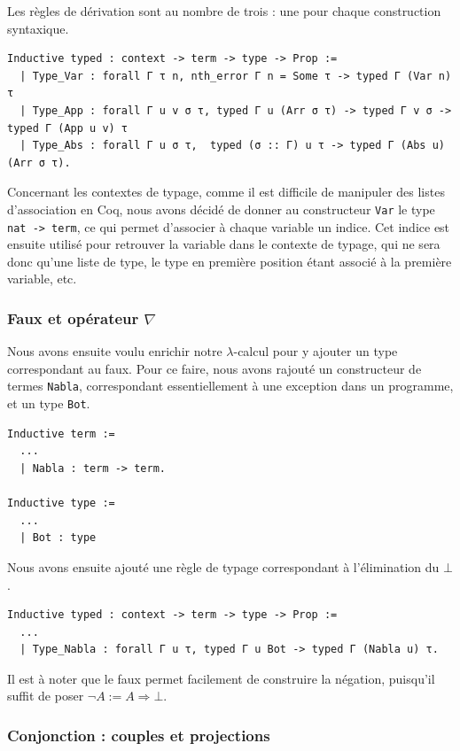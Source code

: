 \documentclass[a4paper]{article}
\theoremstyle{remark}
\theoremstyle{remark}
\theoremstyle{remark}
\theoremstyle{definition}
\theoremstyle{definition}
\theoremstyle{definition}
\begin{document}
Les règles de dérivation sont au nombre de trois : une pour chaque construction syntaxique.
\begin{verbatim}
Inductive typed : context -> term -> type -> Prop :=
  | Type_Var : forall Γ τ n, nth_error Γ n = Some τ -> typed Γ (Var n) τ
  | Type_App : forall Γ u v σ τ, typed Γ u (Arr σ τ) -> typed Γ v σ -> typed Γ (App u v) τ
  | Type_Abs : forall Γ u σ τ,  typed (σ :: Γ) u τ -> typed Γ (Abs u) (Arr σ τ).
\end{verbatim}

Concernant les contextes de typage, comme il est difficile de manipuler des listes d'association en Coq, nous avons décidé de donner au constructeur \verb+Var+ le type \verb+nat -> term+, ce qui permet d'associer à chaque variable un indice. Cet indice est ensuite utilisé pour retrouver la variable dans le contexte de typage, qui ne sera donc qu'une liste de type, le type en première position étant associé à la première variable, etc.

\subsubsection{Faux et opérateur $\nabla$}

Nous avons ensuite voulu enrichir notre $\lambda$-calcul pour y ajouter un type correspondant au faux. Pour ce faire, nous avons rajouté un constructeur de termes \verb+Nabla+, correspondant essentiellement à une exception dans un programme, et un type \verb+Bot+.
\begin{verbatim}
Inductive term :=
  ...
  | Nabla : term -> term.
  
Inductive type :=
  ...
  | Bot : type
\end{verbatim}

Nous avons ensuite ajouté une règle de typage correspondant à l'élimination du $\bot$.
\begin{verbatim}
Inductive typed : context -> term -> type -> Prop :=
  ...
  | Type_Nabla : forall Γ u τ, typed Γ u Bot -> typed Γ (Nabla u) τ.
\end{verbatim}

Il est à noter que le faux permet facilement de construire la négation, puisqu'il suffit de poser $\neg A := A \Rightarrow \bot$.

\subsubsection{Conjonction : couples et projections}
\end{document}
